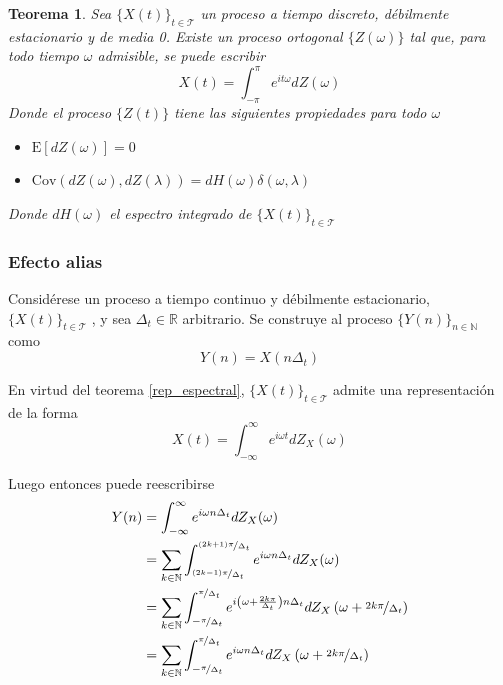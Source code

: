 \documentclass[12pt,letterpaper]{book}
\newtheorem{teorema}{Teorema}[chapter]
\newcommand{\R}{\mathbb{R}}
\newcommand{\N}{\mathbb{N}}
\newcommand{\intR}{\int_{-\infty}^{\infty}}
\newcommand{\intPI}{\int_{-\pi}^{\pi}}
\newcommand{\E}[1]{\mathrm{E}\left[ #1 \right]}
\newcommand{\Cov}[1]{\mathrm{Cov}\left( #1 \right)}
\newcommand{\xt}{$\{X(t)\}_{t\in \mathcal{T}}$ }
\begin{document}
\begin{teorema}
\label{rep_espectral2}
Sea \xt un proceso a tiempo discreto, débilmente estacionario y de media 0. Existe un proceso ortogonal $\{Z(\omega)\}$ tal que, para todo tiempo $\omega$ admisible, se puede escribir
\begin{equation*}
X(t) = \intPI e^{i t \omega} dZ(\omega)
\end{equation*}
Donde el proceso $\{Z(t)\}$ tiene las siguientes propiedades para todo $\omega$
\begin{itemize}
\item $\E{dZ(\omega)} = 0$
\item $\Cov{dZ(\omega),dZ(\lambda)} = dH(\omega) \delta(\omega, \lambda)$
\end{itemize}
Donde $dH(\omega)$ el espectro integrado de \xt
\end{teorema}


\subsubsection{Efecto alias}
\label{sec:alias}

Considérese un proceso a tiempo continuo y débilmente estacionario, \xt, y sea $\Delta_t \in \R$ arbitrario.
%
Se construye al proceso $\{Y(n)\}_{n\in \mathbb{N}}$ como
\begin{equation}
Y(n) = X(n \Delta_t)
\end{equation}

En virtud del teorema \ref{rep_espectral}, \xt admite una representación de la forma
\begin{equation}
X(t) = \intR e^{i \omega t }  dZ_X(\omega)
\end{equation}

Luego entonces puede reescribirse
\begin{align}
Y(n) &= \intR e^{i \omega n \Delta_t} dZ_X(\omega) \nonumber \\
&= \sum_{k \in \N} \int_{\nicefrac{(2k-1)\pi}{\Delta_t}}^{\nicefrac{(2k+1)\pi}{\Delta_t}}
e^{i \omega n \Delta_t} dZ_X(\omega) \nonumber \\
&= \sum_{k \in \N} \int_{-\nicefrac{\pi}{\Delta_t}}^{\nicefrac{\pi}{\Delta_t}}
e^{i \left( \omega + \frac{2 k \pi}{\Delta_t} \right) n \Delta_t}
dZ_X\left( \omega + \nicefrac{2 k \pi}{\Delta_t}\right) \nonumber \\
&= \sum_{k \in \N} \int_{-\nicefrac{\pi}{\Delta_t}}^{\nicefrac{\pi}{\Delta_t}}
e^{i \omega n \Delta_t}
dZ_X\left( \omega + \nicefrac{2 k \pi}{\Delta_t}\right)
\end{align}
\end{document}
